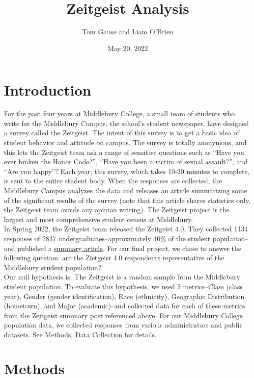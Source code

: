 \documentclass[
]{article}
\title{Zeitgeist Analysis}
\author{Tom Gause and Liam O'Brien}
\date{May 20, 2022}
\begin{document}
\maketitle

\hypertarget{introduction}{%
\section{Introduction}\label{introduction}}

For the past four years at Middlebury College, a small team of students
who write for the Middlebury Campus, the school's student newspaper,
have designed a survey called the Zeitgeist. The intent of this survey
is to get a basic idea of student behavior and attitude on campus. The
survey is totally anonymous, and this lets the Zeitgeist team ask a
range of sensitive questions such as ``Have you ever broken the Honor
Code?'', ``Have you been a victim of sexual assault?'', and ``Are you
happy''? Each year, this survey, which takes 10-20 minutes to complete,
is sent to the entire student body. When the responses are collected,
the Middlebury Campus analyzes the data and releases an article
summarizing some of the significant results of the survey (note that
this article shares statistics only, the Zeitgeist team avoids any
opinion writing). The Zeitgeist project is the largest and most
comprehensive student census at Middlebury.\\
In Spring 2022, the Zeitgeist team released the Zeitgeist 4.0. They
collected 1134 responses of 2837 undergraduates--approximately 40\% of
the student population--and published a
\href{https://www.middleburycampus.com/article/2022/05/zeitgeist-4-0-2022}{summary article}.
For our final project, we chose to answer the following question: are
the Zietgeist 4.0 respondents representative of the Middlebury student
population?\\
Our null hypothesis is: The Zeitgeist is a random sample from the
Middlebury student population. To evaluate this hypothesis, we used 5
metrics--Class (class year), Gender (gender identification), Race
(ethnicity), Geographic Distribution (hometown), and Major
(academic)--and collected data for each of these metrics from the
Zeitgeist summary post referenced above. For our Middlebury College
population data, we collected responses from various administrators and
public datasets. See Methods, Data Collection for details.

\hypertarget{methods}{%
\section{Methods}\label{methods}}
\end{document}
